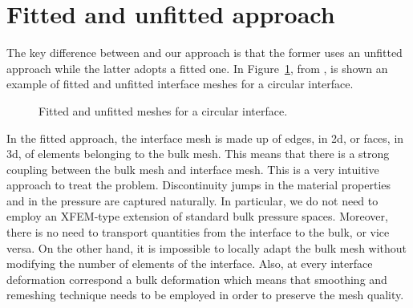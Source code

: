 \section{Fitted and unfitted approach}\label{sec:stokes_fitted_unfitted}
The key difference between \cite{spurious} and our approach is that the former
uses an unfitted approach while the latter adopts a fitted one. In
Figure~\ref{fig:fitted_unfitted}, from \cite[Fig.~1]{spurious}, is shown an
example of fitted and unfitted interface meshes for a circular interface.
\begin{figure}[htbp]
\centering
{}
\caption[Fitted and unfitted meshes]
{Fitted and unfitted meshes for a circular interface.}
\label{fig:fitted_unfitted}
\end{figure}
In the fitted approach, the interface mesh is made up of edges, in 2d, or faces,
in 3d, of elements belonging to the bulk mesh. This means that there is a strong
coupling between the bulk mesh and interface mesh. This is a very intuitive
approach to treat the problem. Discontinuity jumps in the material properties
and in the pressure are captured naturally. In particular, we do not need to
employ an XFEM-type extension of standard bulk pressure spaces. Moreover, there
is no need to transport quantities from the interface to the bulk, or vice
versa. On the other hand, it is impossible to locally adapt the bulk mesh
without modifying the number of elements of the interface. Also, at every
interface deformation correspond a bulk deformation which means that smoothing
and remeshing technique needs to be employed in order to preserve the mesh
quality.

